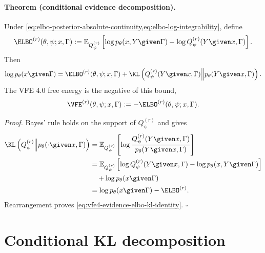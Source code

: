 \paragraph{Theorem (conditional evidence decomposition).}
Under \cref{eq:elbo-posterior-absolute-continuity,eq:elbo-log-integrability}, define
\begin{equation}
\ELBO^{(r)}(\theta,\psi;x,\Gamma)
:=\mathbb E_{Q_\psi^{(r)}}\left[
\log p_\theta(x,Y\given\Gamma)
-\log Q_\psi^{(r)}(Y\given x,\Gamma)
\right].
\label{eq:vfe4-elbo-definition}
\end{equation}
Then
\begin{equation}
\log p_\theta(x\given\Gamma)
=\ELBO^{(r)}(\theta,\psi;x,\Gamma)
+\KL\left(
Q_\psi^{(r)}(Y\given x,\Gamma)
\middle\Vert
p_\theta(Y\given x,\Gamma)
\right).
\label{eq:vfe4-evidence-elbo-kl-identity}
\end{equation}
The VFE 4.0 free energy is the negative of this bound,
\begin{equation}
\VFE^{(r)}(\theta,\psi;x,\Gamma)
:=-\ELBO^{(r)}(\theta,\psi;x,\Gamma).
\label{eq:vfe4-free-energy-definition}
\end{equation}

\emph{Proof.}
Bayes' rule holds on the support of $Q_\psi^{(r)}$ and gives
\begin{equation}
\begin{aligned}
\KL\left(Q_\psi^{(r)}\middle\Vert p_\theta(\mathord{\cdot}\given x,\Gamma)\right)
&=\mathbb E_{Q_\psi^{(r)}}\left[
\log\frac{Q_\psi^{(r)}(Y\given x,\Gamma)}
{p_\theta(Y\given x,\Gamma)}
\right]\\
&=\mathbb E_{Q_\psi^{(r)}}\left[
\log Q_\psi^{(r)}(Y\given x,\Gamma)
-\log p_\theta(x,Y\given\Gamma)
\right]\\
&\quad+\log p_\theta(x\given\Gamma)\\
&=\log p_\theta(x\given\Gamma)-\ELBO^{(r)}.
\end{aligned}
\label{eq:evidence-decomposition-proof}
\end{equation}
Rearrangement proves \cref{eq:vfe4-evidence-elbo-kl-identity}. \hfill$\square$

\section{Conditional KL decomposition}

